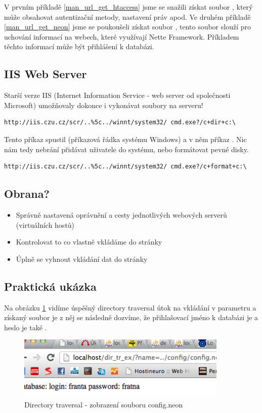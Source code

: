 \documentclass[12pt, a4paper]{report}
\begin{document}
V prvním příkladě \ref{man_url_get_htaccess} jsme se snažili získat soubor , který může obsahovat autentizační metody, nastavení práv apod. Ve druhém příkladě \ref{man_url_get_neon} jsme se poukoušeli získat soubor , tento soubor slouží pro uchování  informací na webech, které využívají Nette Framework. Příkladem těchto informací může být přihlášení k databázi.

\subsection{IIS Web Server}
Starší verze IIS (Internet Information Service - web server od společnosti Microsoft) umožňovaly dokonce i vykonávat soubory na serveru!

\begin{lstlisting}[label=iis_derave,caption=Ukázka URL pro \uv{děravé} IIS]
http://iis.czu.cz/scr/..%5c../winnt/system32/ cmd.exe?/c+dir+c:\
\end{lstlisting}

Tento příkaz spustil  (příkazová řádka systému Windows) a v něm příkaz . Nic nám tedy nebrání přidávat uživatele do systému, nebo formátovat pevné disky.

\begin{lstlisting}[label=iis_derave_format,caption=Formátování disku C: přes chybu v IIS]
http://iis.czu.cz/scr/..%5c../winnt/system32/ cmd.exe?/c+format+c:\
\end{lstlisting}

\subsection{Obrana?}
\begin{itemize}
\item Správně nastavená oprávnění a cesty jednotlivých webových serverů (virtuálních hostů)
\item Kontrolovat to co vlastně vkládáme do stránky
\item Úplně se vyhnout vkládání dat do stránky
\end{itemize}

\subsection{Praktická ukázka}
Na obrázku \ref{obr.directory} vidíme úspěšný directory traversal útok na vkládání v parametru  a získaný soubor je  z něj se následně dozvíme, že přihlašovací jméno k databázi je  a heslo je také .
\begin{figure}[h!]
\centerline{\includegraphics[width=380px]{./examples/dir_example.png}}
\caption{Directory traversal - zobrazení souboru config.neon}
\label{obr.directory}
\end{figure}
\end{document}
